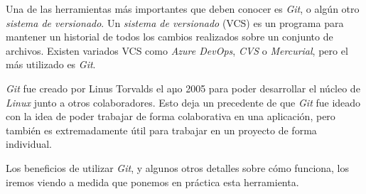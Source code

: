 Una de las herramientas más importantes que deben conocer es \textit{Git}, o algún 
otro \textit{sistema de versionado}.
Un \textit{sistema de versionado} (VCS) es un programa para mantener un historial de todos los 
cambios realizados sobre un conjunto de archivos.
Existen variados VCS como \textit{Azure DevOps}, \textit{CVS} o \textit{Mercurial}, pero el más
utilizado es \textit{Git}.

\textit{Git} fue creado por Linus Torvalds el aµo 2005 para poder desarrollar el núcleo de 
\textit{Linux} junto a otros colaboradores.
Esto deja un precedente de que \textit{Git} fue ideado con la idea de poder trabajar de forma
colaborativa en una aplicación, pero también es extremadamente útil para trabajar en un proyecto
de forma individual.

Los beneficios de utilizar \textit{Git}, y algunos otros detalles sobre cómo funciona, los 
iremos viendo a medida que ponemos en práctica esta herramienta.